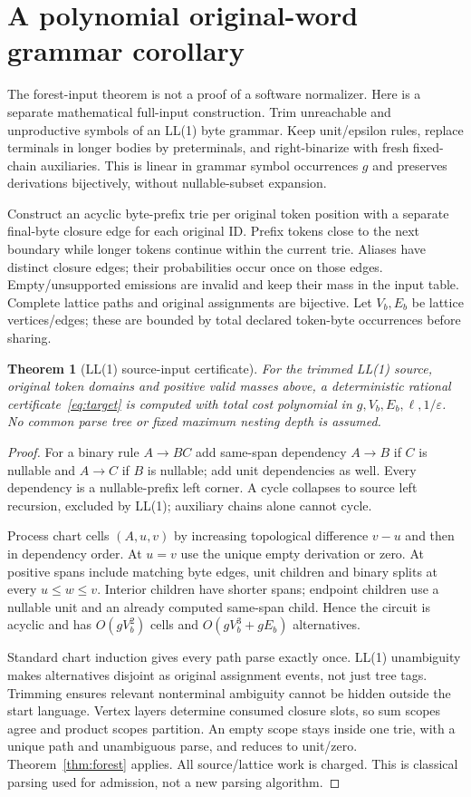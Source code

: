 \documentclass[11pt]{article}
\newtheorem{theorem}{Theorem}
\begin{document}
\section{A polynomial original-word grammar corollary}
The forest-input theorem is not a proof of a software normalizer.
Here is a separate mathematical full-input construction. Trim unreachable
and unproductive symbols of an LL(1) byte grammar. Keep unit/epsilon rules,
replace terminals in longer bodies by preterminals, and right-binarize with
fresh fixed-chain auxiliaries. This is linear in grammar symbol occurrences
$g$ and preserves derivations bijectively, without nullable-subset expansion.

Construct an acyclic byte-prefix trie per original token position with a
separate final-byte closure edge for each original ID. Prefix tokens close
to the next boundary while longer tokens continue within the current trie.
Aliases have distinct closure edges; their probabilities occur once on those
edges. Empty/unsupported emissions are invalid and keep their mass in the
input table. Complete lattice paths and original assignments are bijective.
Let $V_b,E_b$ be lattice vertices/edges; these are bounded by total declared
token-byte occurrences before sharing.

\begin{theorem}[LL(1) source-input certificate]\label{thm:grammar}
For the trimmed LL(1) source, original token domains and positive valid
masses above, a deterministic rational certificate~\eqref{eq:target} is
computed with total cost polynomial in $g,V_b,E_b,\ell,1/\varepsilon$.
No common parse tree or fixed maximum nesting depth is assumed.
\end{theorem}
\begin{proof}
For a binary rule $A\to BC$ add same-span dependency $A\to B$ if $C$ is
nullable and $A\to C$ if $B$ is nullable; add unit dependencies as well.
Every dependency is a nullable-prefix left corner. A cycle collapses to
source left recursion, excluded by LL(1); auxiliary chains alone cannot cycle.

Process chart cells $(A,u,v)$ by increasing topological difference $v-u$
and then in dependency order. At $u=v$ use the unique empty derivation or
zero. At positive spans include matching byte edges, unit children and
binary splits at every $u\leq w\leq v$. Interior children have shorter
spans; endpoint children use a nullable unit and an already computed
same-span child. Hence the circuit is acyclic and has $O(gV_b^2)$ cells
and $O(gV_b^3+gE_b)$ alternatives.

Standard chart induction gives every path parse exactly once. LL(1)
unambiguity makes alternatives disjoint as original assignment events, not
just tree tags. Trimming ensures relevant nonterminal ambiguity cannot be
hidden outside the start language. Vertex layers determine consumed closure
slots, so sum scopes agree and product scopes partition. An empty scope stays
inside one trie, with a unique path and unambiguous parse, and reduces to
unit/zero. Theorem~\ref{thm:forest} applies. All source/lattice work is charged.
This is classical parsing used for admission, not a new parsing algorithm.
\end{proof}
\end{document}
